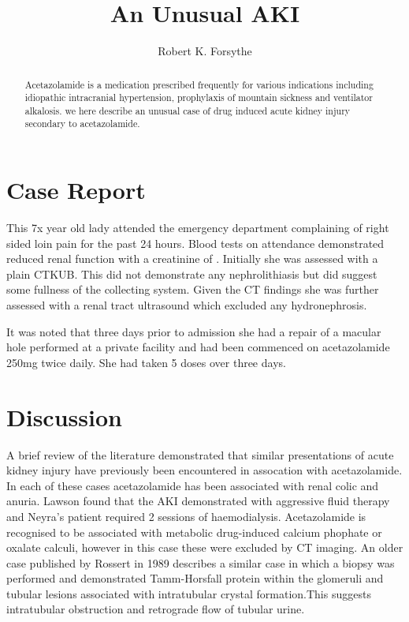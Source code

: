 \documentclass[11pt]{article}
\title{An Unusual AKI}
\author{Robert K. Forsythe}
\begin{document}
\maketitle
\begin{abstract}
	Acetazolamide is a medication prescribed frequently for various indications including idiopathic intracranial hypertension, prophylaxis of mountain sickness and ventilator alkalosis. we here describe an unusual case of drug induced acute kidney injury secondary to acetazolamide. 
\end{abstract}
		
\section*{Case Report}

This 7x year old lady attended the emergency department complaining of right sided loin pain for the past 24 hours. Blood tests on attendance demonstrated reduced renal function with a creatinine of \todo. Initially she was assessed with a plain CTKUB. This did not demonstrate any nephrolithiasis but did suggest some fullness of the collecting system. Given the CT findings she was further assessed with a renal tract ultrasound which excluded any hydronephrosis. 

It was noted that three days prior to admission she had a repair of a macular hole performed at a private facility and had been commenced on acetazolamide 250mg twice daily. She had taken 5 doses over three days. 



\section*{Discussion}
A brief review of the literature demonstrated that similar presentations of acute kidney injury have previously been encountered in assocation with acetazolamide\cite{Neyra2014, Rossert1984, Lawson2020}. In each of these cases acetazolamide has been associated with renal colic and anuria. Lawson found that the AKI demonstrated with aggressive fluid therapy and Neyra's patient required 2 sessions of haemodialysis. Acetazolamide is recognised to be associated with metabolic drug-induced calcium phophate or oxalate calculi, however in this case these were excluded by CT imaging. An older case published by Rossert in 1989 describes a similar case in which a biopsy was performed and demonstrated Tamm-Horsfall protein within the glomeruli and tubular lesions associated with intratubular crystal formation.This suggests intratubular obstruction and retrograde flow of tubular urine\cite{Rossert1984}.  

\printbibliography
\end{document}
